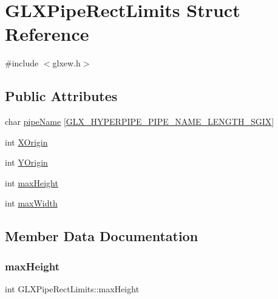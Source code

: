 \hypertarget{struct_g_l_x_pipe_rect_limits}{}\section{G\+L\+X\+Pipe\+Rect\+Limits Struct Reference}
\label{struct_g_l_x_pipe_rect_limits}


{\ttfamily \#include $<$glxew.\+h$>$}

\subsection*{Public Attributes}
\begin{DoxyCompactItemize}
\item 
char \mbox{\hyperlink{struct_g_l_x_pipe_rect_limits_ae78b4b6656101bc841946733a5b6e5ce}{pipe\+Name}} \mbox{[}\mbox{\hyperlink{glxew_8h_ae1c8261c0861010d8003a31d07e26005}{G\+L\+X\+\_\+\+H\+Y\+P\+E\+R\+P\+I\+P\+E\+\_\+\+P\+I\+P\+E\+\_\+\+N\+A\+M\+E\+\_\+\+L\+E\+N\+G\+T\+H\+\_\+\+S\+G\+IX}}\mbox{]}
\item 
int \mbox{\hyperlink{struct_g_l_x_pipe_rect_limits_a3e5a965059d9f5d2ca42acd35af5bb9b}{X\+Origin}}
\item 
int \mbox{\hyperlink{struct_g_l_x_pipe_rect_limits_a50e06bcf0dae95854be7d93a515199e9}{Y\+Origin}}
\item 
int \mbox{\hyperlink{struct_g_l_x_pipe_rect_limits_a27572e499c0d3280031c2ad8e387c0c1}{max\+Height}}
\item 
int \mbox{\hyperlink{struct_g_l_x_pipe_rect_limits_a8662c7a712b30620e25fc994adf337a1}{max\+Width}}
\end{DoxyCompactItemize}


\subsection{Member Data Documentation}
\mbox{\label{struct_g_l_x_pipe_rect_limits_a27572e499c0d3280031c2ad8e387c0c1}} 
\subsubsection{\texorpdfstring{max\+Height}{maxHeight}}
{\footnotesize\ttfamily int G\+L\+X\+Pipe\+Rect\+Limits\+::max\+Height}

